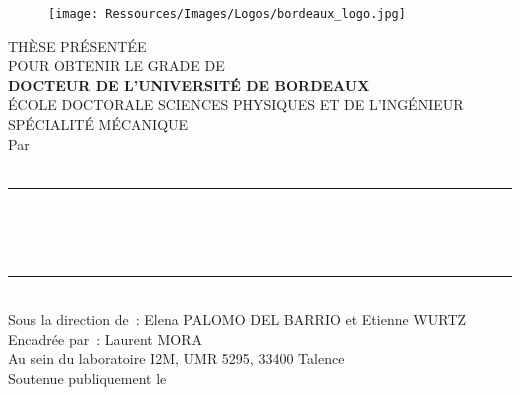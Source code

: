 

\begin{titlepage}
\begin{figure}
    \raggedright
    \texttt{[image: Ressources/Images/Logos/bordeaux\_logo.jpg]}
\end{figure}

\vfill

\begin{center}
    THÈSE PRÉSENTÉE \\
    POUR OBTENIR LE GRADE DE \\[0.8cm]

    \textsc{\Large \textbf{ DOCTEUR DE L'UNIVERSITÉ DE BORDEAUX}}\\[1.5cm] %

    ÉCOLE DOCTORALE SCIENCES PHYSIQUES ET DE L'INGÉNIEUR\\[0.3cm]
    SPÉCIALITÉ MÉCANIQUE\\[1.0cm]
    {\Large Par \myAuthor}\\

    ~\\[0.3cm]
    {\color{SolarizedBrBlue} \rule{\textwidth}{1pt} \vspace{1ex} \filcenter\color{defaultcolor}}
    ~\\[0.01cm]
    {\Large \bfseries \myTitle{}} %
    ~\\[0.2cm]
    {\normalsize \myTitleENG{}} %
    ~\\[0.2cm]
    {\color{SolarizedBrBlue} \rule{\textwidth}{1pt} \vspace{1ex} \filcenter\color{defaultcolor}}
    ~\\[0.25cm] %

    Sous la direction de~: Elena PALOMO DEL BARRIO et Etienne WURTZ \\
    Encadrée par~: Laurent MORA \\
    Au sein du laboratoire I2M, UMR 5295, 33400 Talence \\[1.0cm]
    Soutenue publiquement le \myDate
\end{center}

\vfill


\end{titlepage}
